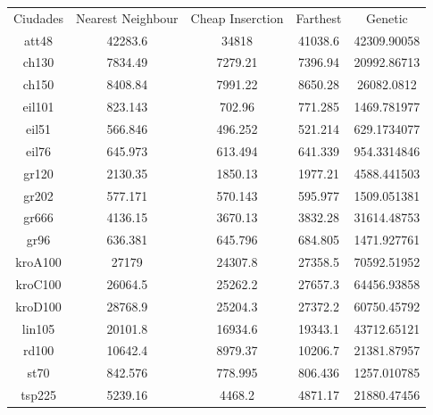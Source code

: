 \documentclass{article}
\begin{document}
\begin{tabular}{ccccc}
Ciudades & Nearest Neighbour & Cheap Inserction & Farthest & Genetic \\
att48 & 42283.6 & 34818 & 41038.6 & 42309.90058 \\
ch130 & 7834.49 & 7279.21 & 7396.94 & 20992.86713 \\
ch150 & 8408.84 & 7991.22 & 8650.28 & 26082.0812 \\
eil101 & 823.143 & 702.96 & 771.285 & 1469.781977 \\
eil51 & 566.846 & 496.252 & 521.214 & 629.1734077 \\
eil76 & 645.973 & 613.494 & 641.339 & 954.3314846 \\
gr120 & 2130.35 & 1850.13 & 1977.21 & 4588.441503 \\
gr202 & 577.171 & 570.143 & 595.977 & 1509.051381 \\
gr666 & 4136.15 & 3670.13 & 3832.28 & 31614.48753 \\
gr96 & 636.381 & 645.796 & 684.805 & 1471.927761 \\
kroA100 & 27179 & 24307.8 & 27358.5 & 70592.51952 \\
kroC100 & 26064.5 & 25262.2 & 27657.3 & 64456.93858 \\
kroD100 & 28768.9 & 25204.3 & 27372.2 & 60750.45792 \\
lin105 & 20101.8 & 16934.6 & 19343.1 & 43712.65121 \\
rd100 & 10642.4 & 8979.37 & 10206.7 & 21381.87957 \\
st70 & 842.576 & 778.995 & 806.436 & 1257.010785 \\
tsp225 & 5239.16 & 4468.2 & 4871.17 & 21880.47456 \\
\end{tabular} 
\end{document}
